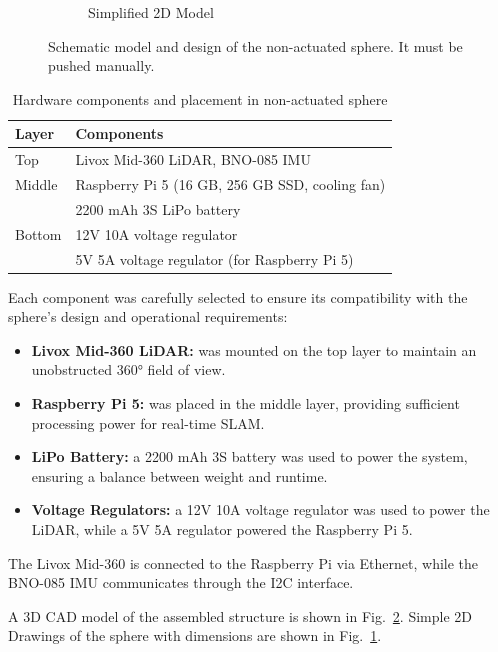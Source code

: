 \documentclass[english, bachelor, utf8]{base/thesis_telematics}
\begin{document}
\begin{figure}
\begin{subfigure}{0.4\columnwidth}
    \caption{Simplified 2D Model}
    \label{fig:2d-model}
\end{subfigure}
\caption{Schematic model and design of the non-actuated sphere.
It must be pushed manually.}
\label{fig:cad-design1}
\end{figure}
\begin{table}
\centering
\caption{Hardware components and placement in non-actuated sphere}
\label{tab:hardware_components_non_actuated}
\begin{tabularx}{\linewidth}{@{}l X@{}}
\toprule
\textbf{Layer} & \textbf{Components} \\
\midrule
Top    & Livox Mid-360 LiDAR, BNO-085 IMU \\
Middle & Raspberry Pi 5 (16 GB, 256 GB SSD, cooling fan) \\
       & 2200 mAh 3S LiPo battery \\
Bottom & 12V 10A voltage regulator \\
       & 5V 5A voltage regulator (for Raspberry Pi 5) \\

\bottomrule
\end{tabularx}
\vspace{-1em}
\end{table}

Each component was carefully selected to ensure its compatibility with the sphere's design and operational requirements:
\begin{itemize}
    \item \textbf{Livox Mid-360 LiDAR:} was mounted on the top layer to maintain an unobstructed 360° field of view.
    \item \textbf{Raspberry Pi 5:} was placed in the middle layer, providing sufficient processing power for real-time SLAM.
    \item \textbf{LiPo Battery:} a 2200 mAh 3S battery was used to power the system, ensuring a balance between weight and runtime.
    \item \textbf{Voltage Regulators:} a 12V 10A voltage regulator was used to power the LiDAR, while a 5V 5A regulator powered the Raspberry Pi 5.
\end{itemize}
The Livox Mid-360 is connected to the Raspberry Pi via Ethernet, while the BNO-085 IMU communicates through the I2C interface. 

A 3D CAD model of the assembled structure is shown in Fig.~\ref{fig:cad-design1}.
Simple 2D Drawings of the sphere with dimensions are shown in Fig.~\ref{fig:2d-model}.
\end{document}
